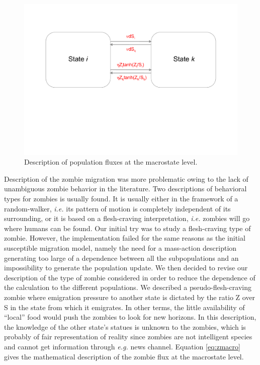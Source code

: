\documentclass[11pt]{article} %
\begin{document}
\begin{figure}[h!]
\centerline{
\includegraphics[scale=0.40]{../images/Powerpoint_figures/macrostate.pdf}}
\caption{Description of population fluxes at the macrostate level.
\label{macrostate} }
\end{figure}


Description of the zombie migration was more problematic owing to the lack of unambiguous zombie behavior in the literature. Two descriptions of behavioral types for zombies is usually found. It is usually either in the framework of a random-walker, \textit{i.e.} its pattern of motion is completely independent of its surrounding, or it is based on a flesh-craving interpretation, \textit{i.e.} zombies will go where humans can be found. Our initial try was to study a flesh-craving type of zombie. However, the implementation failed for the same reasons as the initial susceptible migration model, namely the need for a mass-action description generating too large of a dependence between all the subpopulations and an impossibility to generate the population update. We then decided to revise our description of the type of zombie considered in order to reduce the dependence of the calculation to the different populations. We described a pseudo-flesh-craving zombie where emigration pressure to another state is dictated by the ratio Z over S in the state from which it emigrates. In other terms, the little availability of ``local'' food would push the zombies to look for new horizons. In this description, the knowledge of the other state's statues is unknown to the zombies, which is probably of fair representation of reality since zombies are not intelligent species and cannot get information through \textit{e.g.} news channel. Equation \eqref{eq:zmacro} gives the mathematical description of the zombie flux at the macrostate level. 
\end{document}

